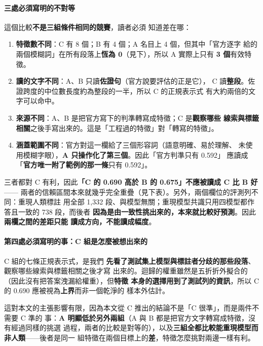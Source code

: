 \documentclass[11pt,a4paper]{ctexart}
\begin{document}
\paragraph{三處必須寫明的不對等} 這個比較\textbf{不是三組條件相同的競賽}，讀者必須
知道差在哪：

\begin{enumerate}[leftmargin=2.2em, itemsep=2pt]
  \item \textbf{特徵數不同}：C 有 8 個；B 有 4 個；A 名目上 4 個，但其中「官方逐字
        給的兩個模糊詞」在所有段落上\textbf{恆為 0}（見下），所以 A 實際上只有
        \textbf{3 個}有效特徵。
  \item \textbf{讀的文字不同}：A、B 只讀\textbf{佐證句}（官方說要評估的正是它），
        C 讀\textbf{整段}。佐證跨度的中位數長度約為整段的一半，所以 C 的正規表示式
        有大約兩倍的文字可以命中。
  \item \textbf{來源不同}：A、B 是把官方寫下的判準轉寫成特徵；C 是\textbf{觀察哪些
        線索與標籤相關}之後手寫出來的。這是「工程過的特徵」對「轉寫的特徵」。
  \item \textbf{涵蓋範圍不同}：官方對這一欄給了三個形容詞（語意明確、易於理解、
        未使用模糊字眼），\textbf{A 只操作化了第三個}。因此「官方判準只有 0.592」
        應讀成「\textbf{官方唯一附了範例的那一條}只有 0.592」。
\end{enumerate}

三者都對 C 有利，因此\textbf{「C 的 0.690 高於 B 的 0.675」不應被讀成 C 比 B 好}——
兩者的信賴區間本來就幾乎完全重疊（見下表）。另外，兩個欄位的評測列不同：重現人類標註
用全部 1{,}332 段、與模型無關；重現模型共識只用四模型都作答且一致的 738 段，而後者
\textbf{因為是由一致性挑出來的，本來就比較好預測}。因此\textbf{兩欄之間的差距只能
讀成方向，不能讀成幅度}。

\paragraph{第四處必須寫明的事：C 組是怎麼被想出來的} C 組的七條正規表示式，是我們
\textbf{先看了測試集上模型與標註者分歧的那些段落}、觀察哪些線索與標籤相關之後才寫
出來的。迴歸的權重雖然是五折折外擬合的（因此沒有把答案洩漏給權重），但\textbf{特徵
本身的選擇用到了測試列的資訊}，所以 C 的 0.690 應被視為\textbf{上界}而非一個乾淨的
樣本外估計。

\medskip
這對本文的主張影響有限，因為本文從 C 推出的結論不是「C 很準」，而是兩件不需要 C 準的
事：\textbf{A 明顯低於另外兩組}（A 與 B 都是把官方文字轉寫成特徵，沒有經過同樣的挑選
過程，兩者的比較是對等的），以及\textbf{三組全都比較能重現模型而非人類}——後者是同一
組特徵在兩個目標上的\textbf{差}，特徵怎麼挑對兩邊一樣有利。
\end{document}
